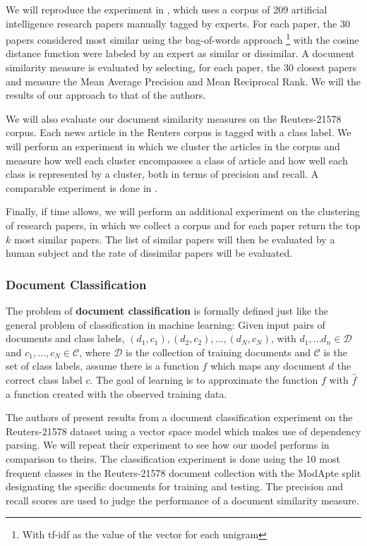 \documentclass[11pt]{article}
\begin{document}
We will reproduce the experiment in \cite{Hurtado2013},  which uses a corpus of 209 artificial intelligence research papers manually tagged by experts. For each paper, the 30 papers considered most similar using the bag-of-words approach \footnote{With tf-idf as the value of the vector for each unigram} with  the cosine distance function were labeled by an expert as similar or dissimilar. A document similarity measure is evaluated by selecting, for each paper, the 30 closest papers and measure the Mean Average Precision and Mean Reciprocal Rank. We will the results of our approach to that of the authors. 

We will also evaluate our document similarity measures on the Reuters-21578 corpus. Each news article in the Reuters corpus is tagged with a class label. We will perform an experiment in which we cluster the articles in the corpus and measure how well each cluster encompasses a class of article and how well each class is represented by a cluster, both in terms of precision and recall. A comparable experiment is done in \cite{Hofmann2000}. 

Finally, if time allows, we will perform an additional experiment on the clustering of research papers, in which we collect a corpus and for each paper return the top $k$ most similar papers. The list of similar papers will then be evaluated by a human subject and the rate of dissimilar papers will be evaluated. 

\subsubsection{Document Classification} \label{sec:DocumentClassification}

The problem of \textbf{document classification} is formally defined just like the general problem of classification in machine learning: Given input pairs of documents and class labels, $(d_1, c_1), (d_2, c_2), \dots, (d_N, c_N)$, with $d_1, \dots d_n \in \mathcal{D}$ and $c_1, \dots, c_N \in \mathcal{C}$, where  $\mathcal{D}$ is the collection of training documents and $\mathcal{C}$ is the set of class labels, assume there is a function $f$ which maps any document $d$ the correct class label $c$. The goal of learning is to approximate the function $f$ with $\hat{f}$ a function created with the observed training data. 

The authors of \cite{Nastase2007} present results from a document classification experiment on the Reuters-21578 dataset using a vector space model which makes use of dependency parsing. We will repeat their experiment to see how our model performs in comparison to theirs. The classification experiment is done using the 10 most frequent classes in the Reuters-21578 document collection with the ModApte split designating the specific documents for training and testing. The precision and recall scores are used to judge the performance of a document similarity measure. 
\end{document}
